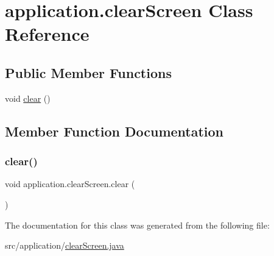 \hypertarget{classapplication_1_1clear_screen}{}\section{application.\+clear\+Screen Class Reference}
\label{classapplication_1_1clear_screen}
\subsection*{Public Member Functions}
\begin{DoxyCompactItemize}
\item 
void \mbox{\hyperlink{classapplication_1_1clear_screen_a120c522f0dd118c3e364dffccfc3144b}{clear}} ()
\end{DoxyCompactItemize}


\subsection{Member Function Documentation}
\mbox{\label{classapplication_1_1clear_screen_a120c522f0dd118c3e364dffccfc3144b}} 
\subsubsection{\texorpdfstring{clear()}{clear()}}
{\footnotesize\ttfamily void application.\+clear\+Screen.\+clear (\begin{DoxyParamCaption}{ }\end{DoxyParamCaption})}



The documentation for this class was generated from the following file\+:\begin{DoxyCompactItemize}
\item 
src/application/\mbox{\hyperlink{clear_screen_8java}{clear\+Screen.\+java}}\end{DoxyCompactItemize}
